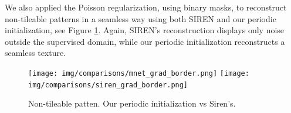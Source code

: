 We also applied the Poisson regularization, using binary masks, to reconstruct non-tileable patterns in a seamless way using both SIREN and our periodic initialization, see Figure \ref{f:comparison_siren_nontileable}. Again, SIREN's reconstruction displays only noise outside the supervised domain, while our periodic initialization reconstructs a seamless texture.

\begin{figure}[!h]
\centering
\texttt{[image: img/comparisons/mnet\_grad\_border.png]}
\texttt{[image: img/comparisons/siren\_grad\_border.png]}
\vspace{-0.3cm}
\caption{Non-tileable patten. Our periodic initialization vs Siren's.}
\label{f:comparison_siren_nontileable}
\end{figure}




